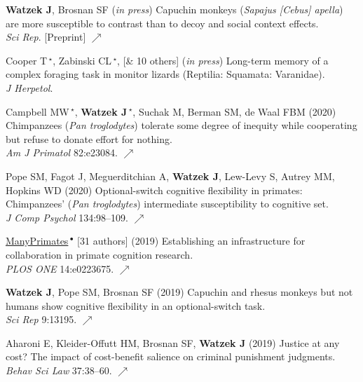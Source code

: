 \documentclass[]{friggeri-cv}
\begin{document}
\begin{enumerate}[label={[\,\arabic*\,]}]
  \item {\textbf{Watzek J}, Brosnan SF (\emph{in press}) Capuchin monkeys (\emph{Sapajus [Cebus] apella}) are more susceptible to contrast than to decoy and social context effects. \\\emph{Sci Rep}. [Preprint] \href{https://doi.org/10.31219/osf.io/3s4km}{\small $\nearrow$}} 
  \item Cooper T\,{\Large${}^\star$}, Zabinski CL\,{\Large${}^\star$}, [\& 10 others] (\emph{in press}) Long-term memory of a complex foraging task in monitor lizards (Reptilia: Squamata: Varanidae). \\\emph{J Herpetol}.
  \item {Campbell MW\,{\Large${}^\star$}, \textbf{Watzek J\,{\Large${}^\star$}}, Suchak M, Berman SM, de Waal FBM (2020) Chimpanzees (\emph{Pan troglodytes}) tolerate some degree of inequity while cooperating but refuse to donate effort for nothing. \\\emph{Am J Primatol} 82:e23084. \href{https://doi.org/10.1002/ajp.23084}{\small $\nearrow$} }\enlargethispage{1.97\baselineskip}
  \item {Pope SM, Fagot J, Meguerditchian A, \textbf{Watzek J}, Lew-Levy S, Autrey MM, Hopkins WD (2020) Optional-switch cognitive flexibility in primates: Chimpanzees' (\emph{Pan troglodytes}) intermediate susceptibility to cognitive set. \\\emph{J Comp Psychol} 134:98–109. \href{https://doi.org/10.1037/com0000194}{\small $\nearrow$} }
  \item {\ul{ManyPrimates}\,${}^\bullet$ [31 authors] (2019) Establishing an infrastructure for collaboration in primate cognition research. \\\emph{PLOS ONE} 14:e0223675. \href{https://doi.org/10.1371/journal.pone.0223675}{\small $\nearrow$}}
  \item {\textbf{Watzek J}, Pope SM, Brosnan SF (2019) Capuchin and rhesus monkeys but not humans show cognitive flexibility in an optional-switch task. \\\emph{Sci Rep} 9:13195. \href{https://doi.org/10.1038/s41598-019-49658-0}{\small $\nearrow$}}
  \item {Aharoni E, Kleider-Offutt HM, Brosnan SF, \textbf{Watzek J} (2019) Justice at any cost? The impact of cost-benefit salience on criminal punishment judgments. \\\emph{Behav Sci Law} 37:38–60. \href{https://doi.org/10.1002/bsl.2388}{{\small $\nearrow$}}}

\end{enumerate}
\end{document}
